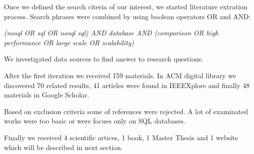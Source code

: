 \documentclass[times, 10pt,twocolumn]{article}
\begin{document}

Once we defined the search citeria of our interest, we started literature extration process.
Search phrases were combined by using boolean operators OR and AND:

\emph{(nosql OR sql OR nosql sql) AND database AND (comparison OR high performance OR large scale OR scalability)}
  
We investigated data sources to find answer to research questions.

After the first iteration we received 159 materials. In ACM digital library we discovered 70 related results, 41 articles were found in IEEEXplore and finally 48 materials in Google Scholar.

Based on exclusion criteria some of references were rejected. A lot of examinated works were too basic or were focues only on SQL databases.


Finally we received 4 scientific artices, 1 book, 1 Master Thesis and 1 website which will be described in next section.

 



\end{document}
